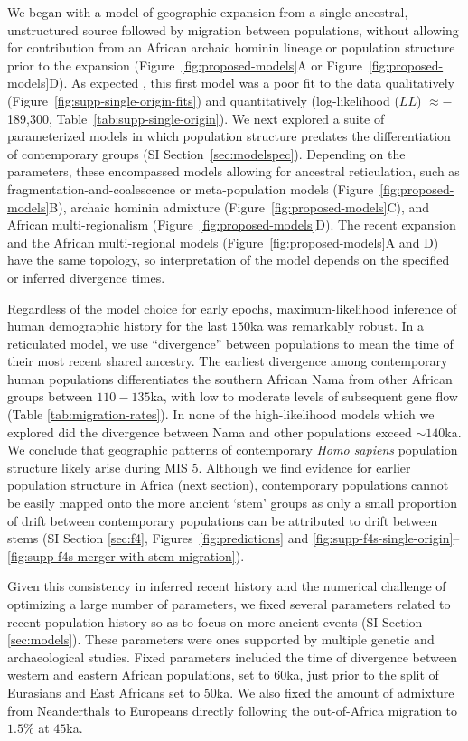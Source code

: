 \documentclass[]{article}
\begin{document}
We began with a model of geographic expansion from a single ancestral,
unstructured source followed by migration between populations, without allowing
for contribution from an African archaic hominin lineage or population
structure prior to the expansion (Figure~\ref{fig:proposed-models}A or
Figure~\ref{fig:proposed-models}D). As expected \citep{Ragsdale2019-nt}, this
first model was a poor fit to the data qualitatively
(Figure~\ref{fig:supp-single-origin-fits}) and quantitatively (log-likelihood
($LL$) $\approx-$189,300, Table~\ref{tab:supp-single-origin}). We next
explored a suite of parameterized models in which population structure predates
the differentiation of contemporary groups (SI
Section~\ref{sec:modelspec}). Depending on the parameters, these encompassed
models allowing for ancestral reticulation, such as
fragmentation-and-coalescence or meta-population models
(Figure~\ref{fig:proposed-models}B), archaic hominin admixture
(Figure~\ref{fig:proposed-models}C), and African multi-regionalism
(Figure~\ref{fig:proposed-models}D). The recent expansion and the African
multi-regional models (Figure~\ref{fig:proposed-models}A and D) have the same
topology, so interpretation of the model depends on the specified or inferred
divergence times.

Regardless of the model choice for early epochs, maximum-likelihood inference
of human demographic history for the last $150$ka was remarkably robust.  In a
reticulated model, we use ``divergence'' between populations to mean the time
of their most recent shared ancestry. The earliest divergence among
contemporary human populations differentiates the southern African Nama from
other African groups between $110-135$ka, with low to moderate levels of
subsequent gene flow (Table \ref{tab:migration-rates}). In none of the
high-likelihood models which we explored did the divergence between Nama and
other populations exceed $\sim140$ka. We conclude that geographic patterns of
contemporary \emph{Homo sapiens} population structure likely arise during MIS
5. Although we find evidence for earlier population structure in Africa (next
section), contemporary populations cannot be easily mapped onto the more
ancient `stem' groups as only a small proportion of drift between contemporary
populations can be attributed to drift between stems (SI Section \ref{sec:f4},
Figures~\ref{fig:predictions} and
\ref{fig:supp-f4s-single-origin}--\ref{fig:supp-f4s-merger-with-stem-migration}).

Given this consistency in inferred recent history and the numerical challenge
of optimizing a large number of parameters, we fixed several parameters related
to recent population history so as to focus on more ancient events (SI Section
\ref{sec:models}). These parameters were ones supported by multiple genetic and
archaeological studies. Fixed parameters included the time of divergence
between western and eastern African populations, set to $60$ka, just prior to
the split of Eurasians and East Africans set to $50$ka. We also fixed the
amount of admixture from Neanderthals to Europeans directly following the
out-of-Africa migration to $1.5\%$ at $45$ka.
\end{document}
